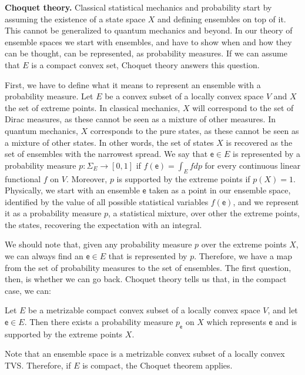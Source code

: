 \documentclass[10pt,twocolumn, nofootinbib]{revtex4-2}
\newcommand{\ens}[1][e] {\mathsf{#1}} %
\begin{document}
\textbf{Choquet theory.} Classical statistical mechanics and probability start by assuming the existence of a state space $X$ and defining ensembles on top of it. This cannot be generalized to quantum mechanics and beyond. In our theory of ensemble spaces we start with ensembles, and have to show when and how they can be thought, can be represented, as probability measures. If we can assume that $E$ is a compact convex set, Choquet theory answers this question.

First, we have to define what it means to represent an ensemble with a probability measure. Let $E$ be a convex subset of a locally convex space $V$ and $X$ the set of extreme points. In classical mechanics, $X$ will correspond to the set of Dirac measures, as these cannot be seen as a mixture of other measures. In quantum mechanics, $X$ corresponds to the pure states, as these cannot be seen as a mixture of other states. In other words, the set of states $X$ is recovered as the set of ensembles with the narrowest spread. We say that $\ens \in E$ is represented by a probability measure $p : \Sigma_{E} \to [0,1]$ if $f(\ens) = \int_E f dp$ for every continuous linear functional $f$ on $V$. Moreover, $p$ is supported by the extreme points if $p(X) = 1$. Physically, we start with an ensemble $\ens$ taken as a point in our ensemble space, identified by the value of all possible statistical variables $f(\ens)$, and we represent it as a probability measure $p$, a statistical mixture, over other the extreme points, the states, recovering the expectation with an integral.

We should note that, given any probability measure $p$ over the extreme points $X$, we can always find an $\ens \in E$ that is represented by $p$. Therefore, we have a map from the set of probability measures to the set of ensembles. The first question, then, is whether we can go back. Choquet theory tells us that, in the compact case, we can:
\begin{thrm}[Choquet 1]
	Let $E$ be a metrizable compact convex subset of a locally convex space $V$, and let $\ens \in E$. Then there exists a probability measure $p_{\ens}$ on $X$ which represents $\ens$ and is supported by the extreme points $X$.
\end{thrm}
Note that an ensemble space is a metrizable convex subset of a locally convex TVS. Therefore, if $E$ is compact, the Choquet theorem applies.
\end{document}
